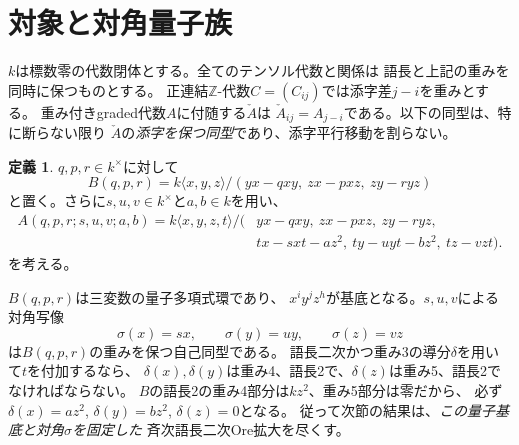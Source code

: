 \documentclass[11pt,a4paper]{ltjsarticle}
\theoremstyle{definition}
\newtheorem{definition}[theorem]{定義}
\begin{document}
\section{対象と対角量子族}
$k$は標数零の代数閉体とする。全てのテンソル代数と関係は
語長と上記の重みを同時に保つものとする。
正連結$\mathbb Z$-代数$C=(C_{ij})$では添字差$j-i$を重みとする。
重み付きgraded代数$A$に付随する$\check A$は
$\check A_{ij}=A_{j-i}$である。以下の同型は、特に断らない限り
$\check A$の\emph{添字を保つ同型}であり、添字平行移動を割らない。

\begin{definition}\label{def:quantum}
$q,p,r\in k^\times$に対して
\[
B(q,p,r)=k\langle x,y,z\rangle/
(yx-qxy,\ zx-pxz,\ zy-ryz)
\]
と置く。さらに$s,u,v\in k^\times$と$a,b\in k$を用い、
\begin{equation}\label{eq:family}
\begin{split}
A(q,p,r;s,u,v;a,b)=k\langle x,y,z,t\rangle/(&yx-qxy,\ zx-pxz,\ zy-ryz,\\
&tx-sxt-az^2,\ ty-uyt-bz^2,\ tz-vzt).
\end{split}
\end{equation}
を考える。
\end{definition}

$B(q,p,r)$は三変数の量子多項式環であり、
$x^iy^jz^h$が基底となる。$s,u,v$による対角写像
\[\sigma(x)=sx,\qquad \sigma(y)=uy,\qquad \sigma(z)=vz\]
は$B(q,p,r)$の重みを保つ自己同型である。
語長二次かつ重み3の導分$\delta$を用いて$t$を付加するなら、
$\delta(x),\delta(y)$は重み4、語長2で、$\delta(z)$は重み5、語長2でなければならない。
$B$の語長2の重み4部分は$kz^2$、重み5部分は零だから、
必ず$\delta(x)=az^2$, $\delta(y)=bz^2$, $\delta(z)=0$となる。
従って次節の結果は、\emph{この量子基底と対角$\sigma$を固定した}
斉次語長二次Ore拡大を尽くす。
\end{document}
